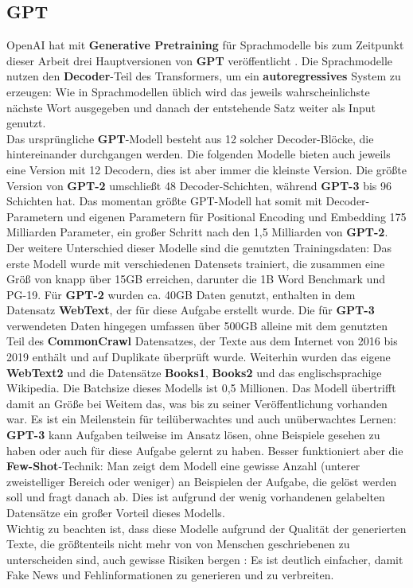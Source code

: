 \subsection{GPT}
OpenAI hat mit \textbf{Generative Pretraining} f\"ur Sprachmodelle bis zum Zeitpunkt dieser Arbeit drei Hauptversionen von \textbf{GPT} ver\"offentlicht \cite{gpt}\cite{gpt2}\cite{gpt3}. Die Sprachmodelle nutzen den \textbf{Decoder}-Teil des Transformers, um ein \textbf{autoregressives} System zu erzeugen: Wie in Sprachmodellen \"ublich wird das jeweils wahrscheinlichste n\"achste Wort ausgegeben und danach der entstehende Satz weiter als Input genutzt.\\
Das urspr\"ungliche \textbf{GPT}-Modell besteht aus 12 solcher Decoder-Bl\"ocke, die hintereinander durchgangen werden. Die folgenden Modelle bieten auch jeweils eine Version mit 12 Decodern, dies ist aber immer die kleinste Version. Die gr\"o{\ss}te Version von \textbf{GPT-2 } umschlie{\ss}t 48 Decoder-Schichten, w\"ahrend \textbf{GPT-3} bis 96 Schichten hat. Das momentan gr\"o{\ss}te GPT-Modell hat somit mit Decoder-Parametern und eigenen Parametern f\"ur Positional Encoding und Embedding 175 Milliarden Parameter, ein gro{\ss}er Schritt nach den 1,5 Milliarden von \textbf{GPT-2}.\\
Der weitere Unterschied dieser Modelle sind die genutzten Trainingsdaten: Das erste Modell wurde mit verschiedenen Datensets trainiert, die zusammen eine Gr\"o{\ss} von knapp \"uber 15GB erreichen, darunter die 1B Word Benchmark und PG-19. F\"ur \textbf{GPT-2} wurden ca. 40GB Daten genutzt, enthalten in dem Datensatz \textbf{WebText}, der f\"ur diese Aufgabe erstellt wurde. Die f\"ur \textbf{GPT-3} verwendeten Daten hingegen umfassen \"uber 500GB alleine mit dem genutzten Teil des \textbf{CommonCrawl} Datensatzes, der Texte aus dem Internet von 2016 bis 2019 enth\"alt und auf Duplikate \"uberpr\"uft wurde. Weiterhin wurden das eigene \textbf{WebText2} und die Datens\"atze \textbf{Books1}, \textbf{Books2} und das englischsprachige Wikipedia. Die Batchsize dieses Modells ist 0,5 Millionen. Das Modell \"ubertrifft damit an Gr\"o{\ss}e bei Weitem das, was bis zu seiner Ver\"offentlichung vorhanden war. Es ist ein Meilenstein f\"ur teil\"uberwachtes und auch un\"uberwachtes Lernen: \textbf{GPT-3} kann Aufgaben teilweise im Ansatz l\"osen, ohne Beispiele gesehen zu haben oder auch f\"ur diese Aufgabe gelernt zu haben. Besser funktioniert aber die \textbf{Few-Shot}-Technik: Man zeigt dem Modell eine gewisse Anzahl (unterer zweistelliger Bereich oder weniger) an Beispielen der Aufgabe, die gel\"ost werden soll und fragt danach ab. Dies ist aufgrund der wenig vorhandenen gelabelten Datens\"atze ein gro{\ss}er Vorteil dieses Modells.\\
Wichtig zu beachten ist, dass diese Modelle aufgrund der Qualit\"at der generierten Texte, die gr\"o{\ss}tenteils nicht mehr von von Menschen geschriebenen zu unterscheiden sind, auch gewisse Risiken bergen \cite{gpt3}: Es ist deutlich einfacher, damit Fake News und Fehlinformationen zu generieren und zu verbreiten.


